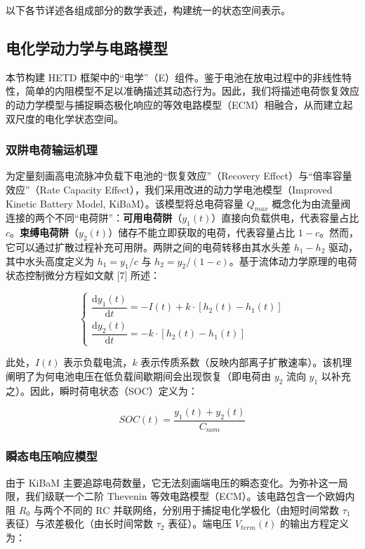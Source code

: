 \documentclass[11pt,a4paper]{ctexart}
\begin{document}
以下各节详述各组成部分的数学表述，构建统一的状态空间表示。

\subsection{电化学动力学与电路模型}

本节构建 HETD 框架中的“电学”（E）组件。鉴于电池在放电过程中的非线性特性，简单的内阻模型不足以准确描述其动态行为。因此，我们将描述电荷恢复效应的动力学模型与捕捉瞬态极化响应的等效电路模型（ECM）相融合，从而建立起双尺度的电化学状态空间。

\subsubsection{双阱电荷输运机理}

为定量刻画高电流脉冲负载下电池的“恢复效应”（Recovery Effect）与“倍率容量效应”（Rate Capacity Effect），我们采用改进的动力学电池模型（Improved Kinetic Battery Model, KiBaM）。该模型将总电荷容量 $Q_{max}$ 概念化为由流量阀连接的两个不同“电荷阱”：\textbf{可用电荷阱}（$y_1(t)$）直接向负载供电，代表容量占比 $c$。\textbf{束缚电荷阱}（$y_2(t)$）储存不能立即获取的电荷，代表容量占比 $1-c$。然而，它可以通过扩散过程补充可用阱。两阱之间的电荷转移由其水头差 $h_1 - h_2$ 驱动，其中水头高度定义为 $h_1 = y_1/c$ 与 $h_2 = y_2/(1-c)$。基于流体动力学原理的电荷状态控制微分方程如文献 [7] 所述：

\begin{equation}
\begin{cases}
\dfrac{\mathrm{d}y_1(t)}{\mathrm{d}t} = -I(t) + k \cdot [h_2(t) - h_1(t)] \\[6pt]
\dfrac{\mathrm{d}y_2(t)}{\mathrm{d}t} = -k \cdot [h_2(t) - h_1(t)]
\end{cases}
\end{equation}

此处，$I(t)$ 表示负载电流，$k$ 表示传质系数（反映内部离子扩散速率）。该机理阐明了为何电池电压在低负载间歇期间会出现恢复（即电荷由 $y_2$ 流向 $y_1$ 以补充之）。因此，瞬时荷电状态（SOC）定义为：

\begin{equation}
SOC(t) = \frac{y_1(t) + y_2(t)}{C_{nom}}
\end{equation}

\subsubsection{瞬态电压响应模型}

由于 KiBaM 主要追踪电荷数量，它无法刻画端电压的瞬态变化。为弥补这一局限，我们级联一个二阶 Thevenin 等效电路模型（ECM）。该电路包含一个欧姆内阻 $R_0$ 与两个不同的 RC 并联网络，分别用于捕捉电化学极化（由短时间常数 $\tau_1$ 表征）与浓差极化（由长时间常数 $\tau_2$ 表征）。端电压 $V_{term}(t)$ 的输出方程定义为：
\end{document}
